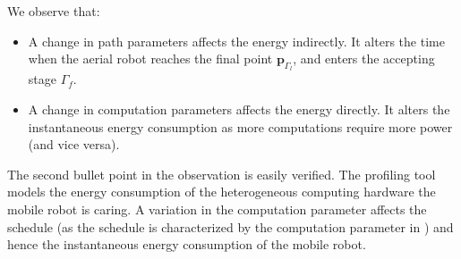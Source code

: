\begin{highlight}
  \begin{obs}
    We observe that:
    \begin{itemize}
      \item A change in path parameters affects the energy indirectly. It alters the time when the aerial robot reaches the final point $\mathbf{p}_{\Gamma_l}$, and enters the accepting stage $\Gamma_f$.
      \item A change in computation parameters affects the energy directly. It alters the instantaneous energy consumption as more computations require more power (and vice versa).
    \end{itemize}
  \end{obs}
\end{highlight}

%  
%  

The second bullet point in the observation is easily verified. The \powprof{} profiling tool models the energy consumption of the heterogeneous computing hardware the mobile robot is caring. A variation in the computation parameter affects the schedule (as the schedule is characterized by the computation parameter in ) and hence the instantaneous energy consumption of the mobile robot.

